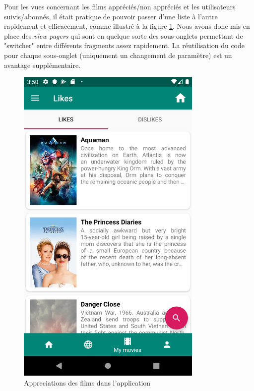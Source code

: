 Pour les vues concernant les films appréciés/non appréciés et les utilisateurs suivis/abonnés, il était pratique de pouvoir passer d'une liste à l'autre rapidement et efficacement, comme illustré à la figure \ref{likes}. Nous avons donc mis en place des \textit{view pagers} qui sont en quelque sorte des sous-onglets permettant de "switcher" entre différents fragments assez rapidement. La réutilisation du code pour chaque sous-onglet (uniquement un changement de paramètre) est un avantage supplémentaire.
\begin{figure}
    \begin{center}
        \includegraphics[width=0.8\textwidth]{img/screenshots/likes.png}
    \end{center}
    \caption{Appreciations des films dans l'application}
    \label{likes}
\end{figure}


